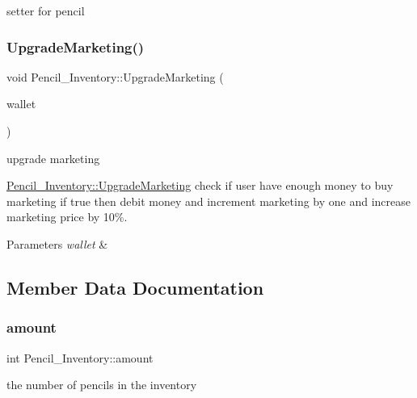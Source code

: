 setter for pencil \mbox{\label{classPencil__Inventory_a1c9d8d2f9859ddeb6397379efcf8941e}} 
\subsubsection{\texorpdfstring{UpgradeMarketing()}{UpgradeMarketing()}}
{\footnotesize\ttfamily void Pencil\+\_\+\+Inventory\+::\+Upgrade\+Marketing (\begin{DoxyParamCaption}\item[{\mbox{\hyperlink{classWallet}{Wallet}} \&}]{wallet }\end{DoxyParamCaption})}



upgrade marketing 

\mbox{\hyperlink{classPencil__Inventory_a1c9d8d2f9859ddeb6397379efcf8941e}{Pencil\+\_\+\+Inventory\+::\+Upgrade\+Marketing}} check if user have enough money to buy marketing if true then debit money and increment marketing by one and increase marketing price by 10\%.


\begin{DoxyParams}{Parameters}
{\em wallet} & \\
\hline
\end{DoxyParams}


\subsection{Member Data Documentation}
\mbox{\label{classPencil__Inventory_a19f4ff72e64dbd5c5fbb1fd302b54c85}} 
\subsubsection{\texorpdfstring{amount}{amount}}
{\footnotesize\ttfamily int Pencil\+\_\+\+Inventory\+::amount\hspace{0.3cm}{\ttfamily [private]}}



the number of pencils in the inventory 

\mbox{\label{classPencil__Inventory_a063e85195a84875c4b3f42c2f01ebdbd}} 

